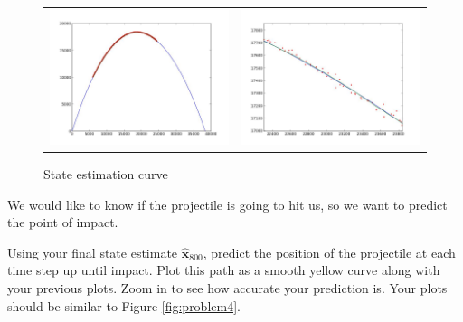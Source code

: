 \begin{figure}
	\centering
	\begin{tabular}{cc} 
	\includegraphics[width=.49\textwidth]{problem3_1.jpg} & 
	\includegraphics[width=.49\textwidth]{problem3_2.jpg}
	\end{tabular}
	\caption{State estimation curve}
	\label{fig:problem3}
\end{figure}

We would like to know if the projectile is going to hit us, so we want to predict the point of impact.

\begin{problem}
Using your final state estimate $\widehat{\mathbf{x}}_{800}$, predict the position of the projectile at each time step up until impact. 
Plot this path as a smooth yellow curve along with your previous plots. 
Zoom in to see how accurate your prediction is.
Your plots should be similar to Figure \ref{fig:problem4}.
\label{prob:predict_traj}
\end{problem}

